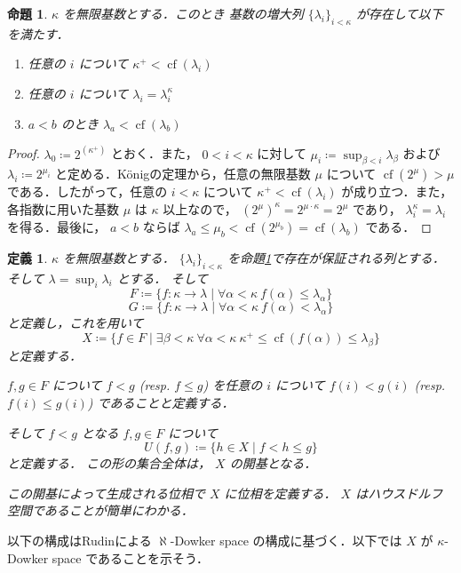 \documentclass[leqno, 12pt]{ltjsarticle}
\newtheorem{prop}[thm]{命題}
\newtheorem{df}[thm]{定義}
\newcommand{\basicopen}[2]{U(#1,#2)}
\newcommand{\kappasucc}{\kappa^{+}}
\DeclareMathOperator{\cf}{cf}
\begin{document}
\begin{prop}\label{prop:card}
$\kappa$
を無限基数とする．このとき
基数の増大列
$\{\lambda_{i}\}_{i<\kappa}$
が存在して以下を満たす．
\begin{enumerate}[label=\textup{(\arabic*)}]
\item 任意の
$i$
について
$\kappasucc <\cf (\lambda_{i})$
\item 任意の
$i$
について
$\lambda_{i}=\lambda_{i}^{\kappa}$
\item
$a<b$
のとき
$\lambda_{a}<\cf(\lambda_{b})$
\end{enumerate}
\end{prop}
\begin{proof}
$\lambda_{0}\coloneqq 2^{(\kappasucc)}$
とおく．また，
$0<i<\kappa$
に対して
$\mu_{i}\coloneqq\sup_{\beta<i}\lambda_{\beta}$
および
$\lambda_{i}\coloneqq 2^{\mu_{i}}$
と定める．K\"onigの定理から，任意の無限基数
$\mu$
について
$\cf(2^{\mu})>\mu$
である．したがって，任意の
$i<\kappa$
について
$\kappasucc<\cf(\lambda_{i})$
が成り立つ．また，各指数に用いた基数
$\mu$
は
$\kappa$
以上なので，
$(2^{\mu})^{\kappa}=2^{\mu\cdot\kappa}=2^{\mu}$
であり，
$\lambda_{i}^{\kappa}=\lambda_{i}$
を得る．最後に，
$a<b$
ならば
$\lambda_{a}\le\mu_{b}<\cf(2^{\mu_{b}})=\cf(\lambda_{b})$
である．
\end{proof}

\begin{df}
$\kappa$
を無限基数とする．
$\{\lambda_{i}\}_{i<\kappa}$
を命題\ref{prop:card}で存在が保証される列とする．
そして
$\lambda=\sup_{i}\lambda_{i}$
とする．
そして
\[
F\coloneqq\{f:\kappa\to \lambda \mid \forall \alpha < \kappa\ f(\alpha)\le \lambda_{\alpha}\}
\]
\[
G\coloneqq\{f:\kappa\to \lambda \mid \forall \alpha < \kappa\ f(\alpha)<\lambda_{\alpha}\}
\]
と定義し，これを用いて
\[
X\coloneqq\{f\in F \mid \exists \beta <\kappa\ \forall \alpha<\kappa\ \kappasucc\le \cf(f(\alpha))\le \lambda_{\beta}\}
\]
と定義する．

$f, g\in F$
について
$f<g$
(resp.
$f\le g$)
を任意の
$i$
について
$f(i)<g(i)$
(resp.
$f(i)\le g(i)$)
であることと定義する．

そして
$f<g$
となる
$f,g\in F$
について
\[
\basicopen{f}{g}\coloneqq\{h\in X \mid f<h\le g\}
\]
と定義する．
この形の集合全体は，
$X$
の開基となる．

この開基によって生成される位相で
$X$
に位相を定義する．
$X$
はハウスドルフ空間であることが簡単にわかる．
\end{df}

以下の構成はRudinによる
$\aleph$-Dowker space
の構成に基づく\cite{2}．以下では
$X$
が
$\kappa$-Dowker space
であることを示そう．
\end{document}
